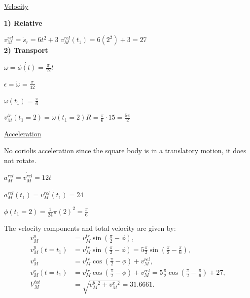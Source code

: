 \documentclass{article}
\begin{document}
\begin{minipage}[t]{0.49\textwidth}

\begin{center} 
\underline{Velocity}
\end{center}
\raggedright
\textbf{1) Relative}

$v_{M}^{rel} = \dot s_r = 6t^2+3$
$v_{M}^{rel}(t_1) = 6(2^2)+3 = 27$\\

\textbf{2) Transport}

$\omega = \dot{\phi(t)} = \frac{\pi}{12} t$

$\epsilon = \dot{\omega} = \frac{\pi}{12}$

$\omega(t_1) = \frac{\pi}{6}$

$v_{M}^{tr}(t_1=2) = \omega(t_1=2) R = \frac{\pi}{6} \cdot 15 = \frac{5\pi}{2}$

\end{minipage}
\hfill
\begin{minipage}[t]{0.49\textwidth}

\begin{center} 
\underline{Acceleration}
\end{center}

No coriolis acceleration since the square body is in a translatory motion, it does not rotate.

$a_{M}^{rel} = \dot{v_{M}^{rel}} = 12t$

$a_{M}^{rel}(t_1) = \dot{v_{M}^{rel}(t_1)} = 24$


\end{minipage}

$\phi(t_1=2) = \frac{1}{24} \pi (2)^2 = \frac{\pi}{6}$

The velocity components and total velocity are given by:
\begin{align*}
    v_{M}^{y} &= v_{M}^{tr} \sin\left(\frac{\pi}{2} - \phi\right), \\
    v_{M}^{y}(t=t_1) &= v_{M}^{tr} \sin\left(\frac{\pi}{2} - \phi\right) = 5\frac{\pi}{2} \sin\left(\frac{\pi}{2} - \frac{\pi}{6}\right), \\
    v_{M}^{x} &= v_{M}^{tr} \cos\left(\frac{\pi}{2} - \phi\right) + v_{M}^{rel}, \\
    v_{M}^{x}(t=t_1) &= v_{M}^{tr} \cos\left(\frac{\pi}{2} - \phi\right) + v_{M}^{rel} = 5\frac{\pi}{2}\cos\left(\frac{\pi}{2} - \frac{\pi}{6}\right) + 27, \\
    V_{M}^{tot} &= \sqrt{v_{M}^{y}^2 + v_{M}^{x}^2} = 31.6661.
\end{align*}
\end{document}
